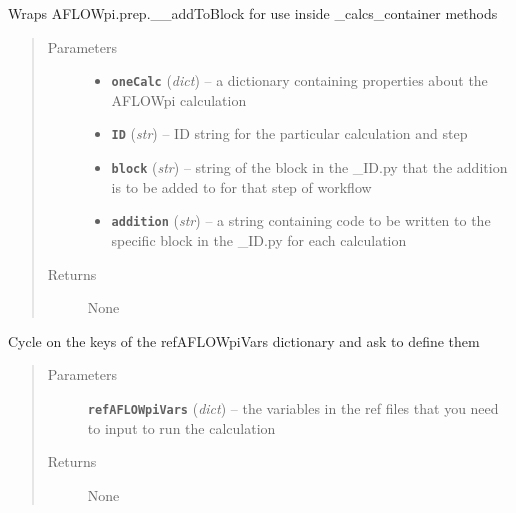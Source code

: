 \documentclass[letterpaper,10pt,english]{sphinxmanual}
\begin{document}

\begin{fulllineitems}
\label{prep:prep.addToBlockWrapper}
Wraps AFLOWpi.prep.\_\_addToBlock for use inside \_calcs\_container methods
\begin{quote}\begin{description}
\item[{Parameters}] \leavevmode\begin{itemize}
\item {} 
\textbf{\texttt{oneCalc}} (\emph{dict}) -- a dictionary containing properties about the AFLOWpi calculation

\item {} 
\textbf{\texttt{ID}} (\emph{str}) -- ID string for the particular calculation and step

\item {} 
\textbf{\texttt{block}} (\emph{str}) -- string of the block in the \_ID.py that the addition is to be added to
for that step of workflow

\item {} 
\textbf{\texttt{addition}} (\emph{str}) -- a string containing code to be written to the specific block
in the \_ID.py for each calculation

\end{itemize}

\item[{Returns}] \leavevmode
None

\end{description}\end{quote}

\end{fulllineitems}


\begin{fulllineitems}
\label{prep:prep.askAFLOWpiVars}
Cycle on the keys of the refAFLOWpiVars dictionary and ask to define them
\begin{quote}\begin{description}
\item[{Parameters}] \leavevmode
\textbf{\texttt{refAFLOWpiVars}} (\emph{dict}) -- the variables in the ref files that you need to input to run the calculation

\item[{Returns}] \leavevmode
None

\end{description}\end{quote}

\end{fulllineitems}
\end{document}
